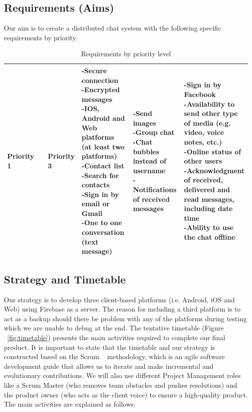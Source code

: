 
\subsection{Requirements (Aims)}

Our aim is to create a distributed chat system with the following specific requirements by  priority.

\begin{table}
\caption{Requirements by priority level}
\label{tab:requirements}
    \begin{tabular}[c]{ | p{5cm} | p{5cm} | p{5cm} |}
		\hline
		\centering\textbf{Priority 1} &  & \centering\textbf{Priority 3} &
    \hline
    \parbox[t]{5cm}{-Secure connection\\-Encrypted messages\\ -IOS, Android and Web platforms (at least two platforms)\\ -Contact list\\ -Search for contacts\\ -Sign in by email or Gmail \\ -One to one conversation (text message)} &  \parbox[t]{5cm}{-Send images\\ -Group chat\\ -Chat bubbles instead of username\\ -Notifications of received messages}
& \parbox[t]{5cm}{-Sign in by Facebook\\ -Availability to send other type of media (e.g. video, voice notes, etc.)\\ -Online status of other users\\ -Acknowledgment of received, delivered and read messages, including date time\\ -Ability to use the chat offline}\\
    \hline
    \end{tabular}
\end{table}


\subsection{Strategy and Timetable}

Our strategy is to develop three client-based platforms (i.e. Android, iOS and Web) using Firebase as a server. The reason for including a third platform is to act as a backup should there be problem with any of the platforms during testing which we are unable to debug at the end. The tentative timetable (Figure ~\ref{fig:timetable}) presents the main activities required to complete our final product. It is important to state that the timetable and our strategy is constructed based on the Scrum ~\cite{scrum} methodology, which  is an agile software development guide that allows us to iterate and make incremental and evolutionary contributions.  We will also use different Project Management roles like a Scrum Master (who removes team obstacles and pushes resolutions) and the product owner (who acts as the client voice) to ensure a high-quality product. The main activities are explained as follows: 

